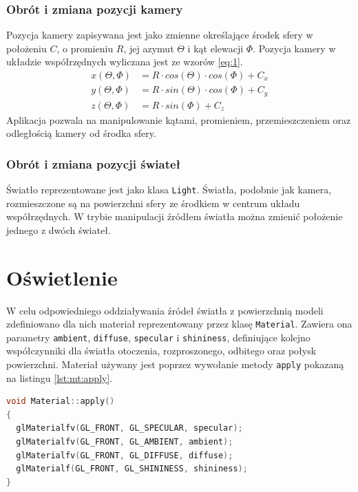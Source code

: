 \subsubsection{Obrót i zmiana pozycji kamery}
Pozycja kamery zapisywana jest jako zmienne określające środek sfery w położeniu $C$, o promieniu $R$, jej azymut $\Theta$ i kąt elewacji $\Phi$. Pozycja kamery w układzie współrzędnych wyliczana jest ze wzorów \ref{eq:1}.
\begin{subequations}
    \label{eq:1}
    \begin{align}  
        x(\Theta, \Phi) &= R \cdot cos(\Theta) \cdot cos(\Phi) + C_x\\
        y(\Theta, \Phi) &= R \cdot sin(\Theta) \cdot cos(\Phi) + C_y\\
        z(\Theta, \Phi) &= R \cdot sin(\Phi) + C_z
    \end{align}  
\end{subequations}
Aplikacja pozwala na manipulowanie kątami, promieniem, przemieszczeniem oraz odległością kamery od środka sfery.
\subsubsection{Obrót i zmiana pozycji świateł}
Światło reprezentowane jest jako klasa \lstinline{Light}. Światła, podobnie jak kamera, rozmieszczone są na powierzchni sfery ze środkiem w centrum układu współrzędnych. W trybie manipulacji źródłem światła można zmienić położenie jednego z dwóch świateł.
\clearpage
\section{Oświetlenie}
W celu odpowiedniego oddziaływania źródeł światła z powierzchnią modeli zdefiniowano dla nich materiał reprezentowany przez klasę \lstinline{Material}. Zawiera ona parametry \lstinline{ambient}, \lstinline{diffuse}, \lstinline{specular} i \lstinline{shininess}, definiujące kolejno współczynniki dla światła otoczenia, rozproszonego, odbitego oraz połysk powierzchni. Materiał używany jest poprzez wywołanie metody \lstinline{apply} pokazaną na listingu \ref{lst:mt:apply}.

\begin{lstlisting}[language=C++, caption=Metoda \lstinline{apply} klasy materiału., label={lst:mt:apply}]
void Material::apply()
{
  glMaterialfv(GL_FRONT, GL_SPECULAR, specular);
  glMaterialfv(GL_FRONT, GL_AMBIENT, ambient);
  glMaterialfv(GL_FRONT, GL_DIFFUSE, diffuse);
  glMaterialf(GL_FRONT, GL_SHININESS, shininess);
}
\end{lstlisting}


